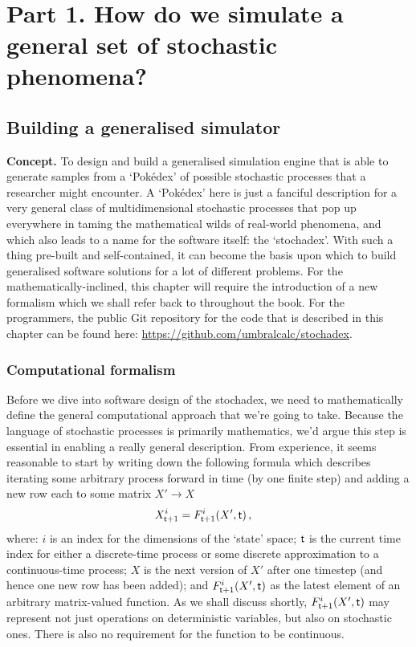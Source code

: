 \documentclass{book}
\begin{document}
\newpage \ \newpage
{\sffamily \tableofcontents}
\mainmatter


\part*{{\sffamily Part 1. {\color{gray75} How do we simulate a general set of stochastic phenomena?}}}


\chapter{\sffamily Building a generalised simulator}

{\bfseries\sffamily Concept.} To design and build a generalised simulation engine that is able to generate samples from a `Pokédex' of possible stochastic processes that a researcher might encounter. A `Pokédex' here is just a fanciful description for a very general class of multidimensional stochastic processes that pop up everywhere in taming the mathematical wilds of real-world phenomena, and which also leads to a name for the software itself: the `stochadex'. With such a thing pre-built and self-contained, it can become the basis upon which to build generalised software solutions for a lot of different problems. For the mathematically-inclined, this chapter will require the introduction of a new formalism which we shall refer back to throughout the book. For the programmers, the public Git repository for the code that is described in this chapter can be found here: \href{https://github.com/umbralcalc/stochadex}{https://github.com/umbralcalc/stochadex}.

\section{\sffamily Computational formalism}

Before we dive into software design of the stochadex, we need to mathematically define the general computational approach that we're going to take. Because the language of stochastic processes is primarily mathematics, we'd argue this step is essential in enabling a really general description. From experience, it seems reasonable to start by writing down the following formula which describes iterating some arbitrary process forward in time (by one finite step) and adding a new row each to some matrix $X' \rightarrow X$
\begin{align}
X^{i}_{{\sf t}+1} &= F^{i}_{{\sf t}+1}(X',{\sf t}) \,, \label{eq:x-step-def}
\end{align}
where: $i$ is an index for the dimensions of the `state' space; ${\sf t}$ is the current time index for either a discrete-time process or some discrete approximation to a continuous-time process; $X$ is the next version of $X'$ after one timestep (and hence one new row has been added); and $F^i_{{\sf t}+1}(X',{\sf t})$ as the latest element of an arbitrary matrix-valued function. As we shall discuss shortly, $F^i_{{\sf t}+1}(X',{\sf t})$ may represent not just operations on deterministic variables, but also on stochastic ones. There is also no requirement for the function to be continuous.
\end{document}
